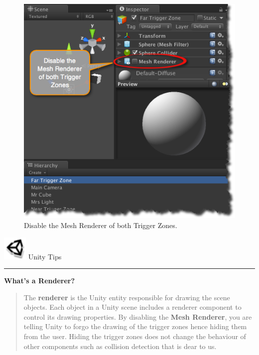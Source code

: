 \begin{figure}[htbp]
\centering
\includegraphics[keepaspectratio,width=\textwidth,height=0.75\textheight]{disable-trigger-zones-mesh-renderer.png}
\caption{Disable the Mesh Renderer of both Trigger Zones.}
\label{disable-trigger-zones-mesh-renderer.png}
\end{figure}
\begin{tipbox}

\includegraphics[width=33pt,height=33pt]{UnityLogo_32x32.png} {\Large \color{black} Unity Tips }

\begin{center}\rule{\textwidth}{0.4pt}\end{center}

\textbf{What's a Renderer?}

\begin{quote}

The \textbf{renderer} is the Unity entity responsible for drawing the scene objects. Each object in a Unity scene includes a renderer component to control its drawing properties. By disabling the \textbf{Mesh Renderer}, you are telling Unity to forgo the drawing of the trigger zones hence hiding them from the user. Hiding the trigger zones does not change the behaviour of other components such as collision detection that is dear to us.
\end{quote}

\end{tipbox}



